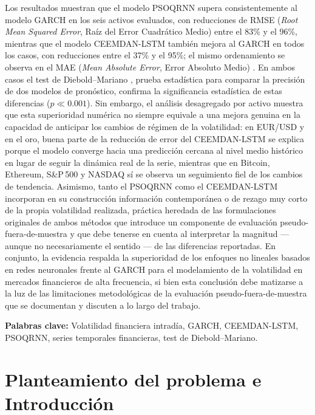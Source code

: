 \documentclass[12pt]{paper}
\begin{document}
Los resultados muestran que el modelo PSOQRNN supera consistentemente al modelo GARCH en los seis activos evaluados, con reducciones de RMSE (\textit{Root Mean Squared Error}, Raíz del Error Cuadrático Medio) \cite{chai2014root} entre el 83\% y el 96\%, mientras que el modelo CEEMDAN-LSTM también mejora al GARCH en todos los casos, con reducciones entre el 37\% y el 95\%; el mismo ordenamiento se observa en el MAE (\textit{Mean Absolute Error}, Error Absoluto Medio) \cite{willmott2005advantages}. En ambos casos el test de Diebold--Mariano \cite{diebold1995comparing}, prueba estadística para comparar la precisión de dos modelos de pronóstico, confirma la significancia estadística de estas diferencias ($p \ll 0.001$). Sin embargo, el análisis desagregado por activo muestra que esta superioridad numérica no siempre equivale a una mejora genuina en la capacidad de anticipar los cambios de régimen de la volatilidad: en EUR/USD y en el oro, buena parte de la reducción de error del CEEMDAN-LSTM se explica porque el modelo converge hacia una predicción cercana al nivel medio histórico en lugar de seguir la dinámica real de la serie, mientras que en Bitcoin, Ethereum, S\&P\,500 y NASDAQ sí se observa un seguimiento fiel de los cambios de tendencia. Asimismo, tanto el PSOQRNN como el CEEMDAN-LSTM incorporan en su construcción información contemporánea o de rezago muy corto de la propia volatilidad realizada, práctica heredada de las formulaciones originales de ambos métodos que introduce un componente de evaluación pseudo-fuera-de-muestra y que debe tenerse en cuenta al interpretar la magnitud --- aunque no necesariamente el sentido --- de las diferencias reportadas. En conjunto, la evidencia respalda la superioridad de los enfoques no lineales basados en redes neuronales frente al GARCH para el modelamiento de la volatilidad en mercados financieros de alta frecuencia, si bien esta conclusión debe matizarse a la luz de las limitaciones metodológicas de la evaluación pseudo-fuera-de-muestra que se documentan y discuten a lo largo del trabajo.

\begin{sloppypar}
\textbf{Palabras clave:} Volatilidad financiera intradía, GARCH, CEEMDAN-LSTM, PSOQRNN, series temporales financieras, test de Diebold--Mariano.
\end{sloppypar}

\newpage

\section[Planteamiento del problema e Introducción]{Planteamiento del problema e Introducción}
\end{document}
